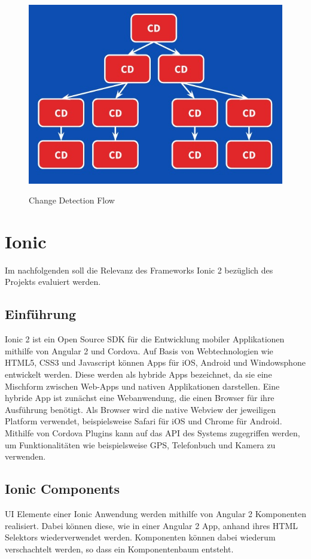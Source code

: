 \begin{figure}[ht]
 \centering
 \includegraphics[width=0.7\linewidth]{kapitel3/cd-tree.jpg}
 \caption{Change Detection Flow}\cite{changedetection-explained}
\end{figure}

\newpage
\section{Ionic}

Im nachfolgenden soll die Relevanz des Frameworks Ionic 2 bezüglich des Projekts \projectname{} evaluiert werden.

\subsection{Einführung}

Ionic 2 ist ein Open Source \ac{SDK} für die Entwicklung mobiler Applikationen mithilfe von Angular 2 und Cordova.
Auf Basis von Webtechnologien wie HTML5, CSS3 und Javascript können Apps für iOS, Android und Windowsphone
entwickelt werden. Diese werden als hybride Apps bezeichnet,
da sie eine Mischform zwischen Web-Apps und nativen Applikationen darstellen.
Eine hybride App ist zunächst eine Webanwendung, die einen Browser für ihre Ausführung benötigt.
Als Browser wird die native Webview der jeweiligen Platform verwendet,
beispielsweise Safari für iOS und Chrome für Android.
Mithilfe von Cordova Plugins kann auf das \ac{API} des Systems zugegriffen werden, um Funktionalitäten wie beispielsweise GPS, Telefonbuch und Kamera zu verwenden.
\cite{ionic34:online}

\subsection{Ionic Components}

\ac{UI} Elemente einer Ionic Anwendung werden mithilfe von Angular 2 Komponenten realisiert.
Dabei können diese, wie in einer Angular 2 App, anhand ihres HTML Selektors wiederverwendet werden.
Komponenten können dabei wiederum verschachtelt werden, so dass ein Komponentenbaum entsteht.

